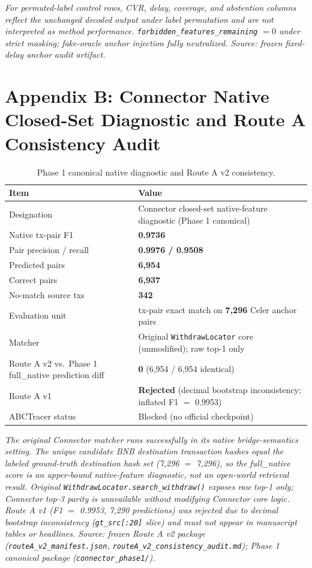 \documentclass[journal]{IEEEtran}
\begin{document}
\emph{For permuted-label control rows, CVR, delay, coverage, and abstention columns reflect the unchanged decoded output under label permutation and are not interpreted as method performance. \texttt{forbidden\_features\_remaining} $= 0$ under strict masking; fake-oracle anchor injection fully neutralized. Source: frozen fixed-delay anchor audit artifact.}

\section*{Appendix B: Connector Native Closed-Set Diagnostic and Route A Consistency Audit}

\begin{table}[!t]
\caption{Phase 1 canonical native diagnostic and Route A v2 consistency.}
\label{tab:B1}
\centering
\begin{tabular}{L{0.55\columnwidth}L{0.37\columnwidth}}
\toprule
Item & Value \\
\midrule
Designation & Connector closed-set native-feature diagnostic (Phase 1 canonical) \\
Native tx-pair F1 & \textbf{0.9736} \\
Pair precision / recall & \textbf{0.9976 / 0.9508} \\
Predicted pairs & \textbf{6{,}954} \\
Correct pairs & \textbf{6{,}937} \\
No-match source txs & \textbf{342} \\
Evaluation unit & tx-pair exact match on \textbf{7{,}296} Celer anchor pairs \\
Matcher & Original \texttt{WithdrawLocator} core (unmodified); raw top-1 only \\
Route A v2 vs.\ Phase 1 full\_native prediction diff & \textbf{0} (6{,}954 / 6{,}954 identical) \\
Route A v1 & \textbf{Rejected} (decimal bootstrap inconsistency; inflated F1 $=$ 0.9953) \\
ABCTracer status & Blocked (no official checkpoint) \\
\bottomrule
\end{tabular}
\end{table}

\emph{The original Connector matcher runs successfully in its native bridge-semantics setting. The unique candidate BNB destination transaction hashes equal the labeled ground-truth destination hash set (7{,}296 $=$ 7{,}296), so the full\_native score is an upper-bound native-feature diagnostic, not an open-world retrieval result. Original \texttt{WithdrawLocator.search\_withdraw()} exposes raw top-1 only; Connector top-3 parity is unavailable without modifying Connector core logic. Route A v1 (F1 $=$ 0.9953, 7{,}290 predictions) was rejected due to decimal bootstrap inconsistency (\texttt{gt\_src[:20]} slice) and must not appear in manuscript tables or headlines. Source: frozen Route A v2 package (\texttt{routeA\_v2\_manifest.json}, \texttt{routeA\_v2\_consistency\_audit.md}); Phase 1 canonical package (\texttt{connector\_phase1/}).}
\end{document}
